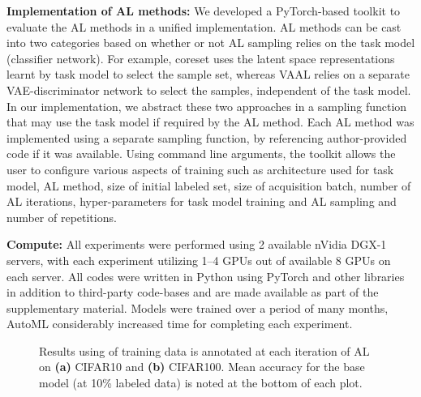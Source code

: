 \documentclass[10pt,twocolumn,letterpaper]{article}
\begin{document}
\noindent \textbf{Implementation of AL methods:} We developed a PyTorch-based toolkit to evaluate the AL methods in a unified implementation. AL methods can be cast into two categories based on whether or not AL sampling relies on the task model (classifier network). For example, coreset uses the latent space representations learnt by task model to select the sample set, whereas VAAL relies on a separate VAE-discriminator network to select the samples, independent of the task model. In our implementation, we abstract these two approaches in a sampling function that may use the task model if required by the AL method. Each AL method was implemented using a separate sampling function, by referencing author-provided code if it was available. Using command line arguments, the toolkit allows the user to configure various aspects of training such as architecture used for task model, AL method, size of initial labeled set, size of acquisition batch, number of AL iterations, hyper-parameters for task model training and AL sampling and number of repetitions. 
\vspace{-0.39em}

\noindent \textbf{Compute:} All experiments were performed using 2 available nVidia DGX-1 servers, with each experiment utilizing 1--4 GPUs out of available 8 GPUs on each server. All codes were written in Python using PyTorch and other libraries in addition to third-party code-bases and are made available as part of the supplementary material. Models were trained over a period of many months, AutoML considerably increased time for completing each experiment.


























\begin{figure*}[t]
\begin{center}
  \vspace{-1em}
\end{center}
    \caption{Results using  of training data is annotated at each iteration of AL on \textbf{(a)} CIFAR10 and \textbf{(b)} CIFAR100. Mean accuracy for the base model (at 10\% labeled data) is noted at the bottom of each plot.}
    
\label{fig:cifar_budgetsize_exp}
  \vspace{-1em}
\end{figure*}
\end{document}
